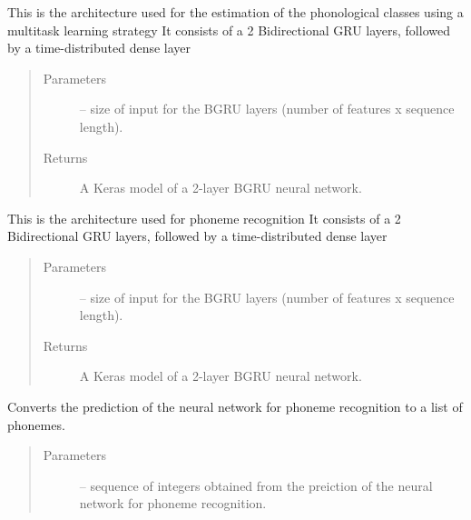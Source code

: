 \documentclass[letterpaper,10pt,english]{sphinxmanual}
\begin{document}
\begin{fulllineitems}

\begin{fulllineitems}
\label{\detokenize{index:phonet.Phonet.model}}
This is the architecture used for the estimation of the phonological classes using a multitask learning strategy
It consists of a 2 Bidirectional GRU layers, followed by a time-distributed dense layer
\begin{quote}\begin{description}
\item[{Parameters}] \leavevmode
{} -- size of input for the BGRU layers (number of features x sequence length).

\item[{Returns}] \leavevmode
A Keras model of a 2-layer BGRU neural network.

\end{description}\end{quote}

\end{fulllineitems}


\begin{fulllineitems}
\label{\detokenize{index:phonet.Phonet.modelp}}
This is the architecture used for phoneme recognition
It consists of a 2 Bidirectional GRU layers, followed by a time-distributed dense layer
\begin{quote}\begin{description}
\item[{Parameters}] \leavevmode
{} -- size of input for the BGRU layers (number of features x sequence length).

\item[{Returns}] \leavevmode
A Keras model of a 2-layer BGRU neural network.

\end{description}\end{quote}

\end{fulllineitems}


\begin{fulllineitems}
\label{\detokenize{index:phonet.Phonet.number2phoneme}}
Converts the prediction of the neural network for phoneme recognition to a list of phonemes.
\begin{quote}\begin{description}
\item[{Parameters}] \leavevmode
{} -- sequence of integers obtained from the preiction of the neural network for phoneme recognition.


\end{description}
\end{quote}
\end{fulllineitems}
\end{fulllineitems}
\end{document}
